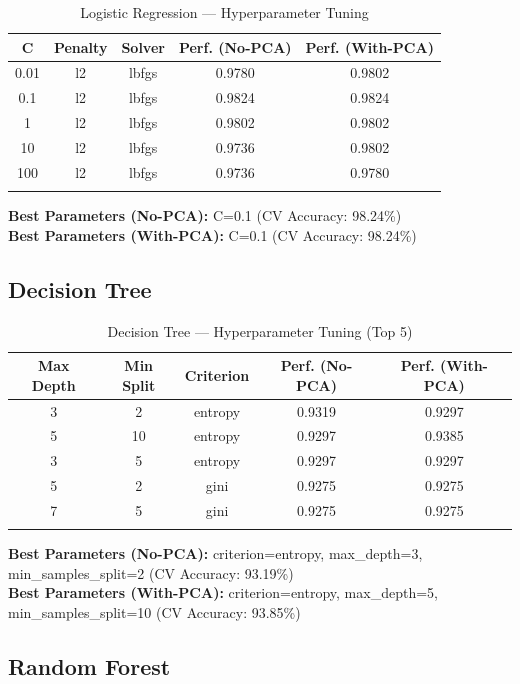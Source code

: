 \documentclass[12pt,a4paper]{article}
\begin{document}
\begin{longtable}{|c|c|c|c|c|}
\hline
\textbf{C} & \textbf{Penalty} & \textbf{Solver} & \textbf{Perf. (No-PCA)} & \textbf{Perf. (With-PCA)} \\ \hline
\endhead
0.01 & l2 & lbfgs & 0.9780 & 0.9802 \\ \hline
0.1 & l2 & lbfgs & 0.9824 & 0.9824 \\ \hline
1 & l2 & lbfgs & 0.9802 & 0.9802 \\ \hline
10 & l2 & lbfgs & 0.9736 & 0.9802 \\ \hline
100 & l2 & lbfgs & 0.9736 & 0.9780 \\ \hline
\caption{Logistic Regression — Hyperparameter Tuning}
\label{tab:lr_tuning}
\end{longtable}

\textbf{Best Parameters (No-PCA):} C=0.1 (CV Accuracy: 98.24\%)\\
\textbf{Best Parameters (With-PCA):} C=0.1 (CV Accuracy: 98.24\%)

\subsection{Decision Tree}

\begin{longtable}{|c|c|c|c|c|}
\hline
\textbf{Max Depth} & \textbf{Min Split} & \textbf{Criterion} & \textbf{Perf. (No-PCA)} & \textbf{Perf. (With-PCA)} \\ \hline
\endhead
3 & 2 & entropy & 0.9319 & 0.9297 \\ \hline
5 & 10 & entropy & 0.9297 & 0.9385 \\ \hline
3 & 5 & entropy & 0.9297 & 0.9297 \\ \hline
5 & 2 & gini & 0.9275 & 0.9275 \\ \hline
7 & 5 & gini & 0.9275 & 0.9275 \\ \hline
\caption{Decision Tree — Hyperparameter Tuning (Top 5)}
\label{tab:dt_tuning}
\end{longtable}

\textbf{Best Parameters (No-PCA):} criterion=entropy, max\_depth=3, min\_samples\_split=2 (CV Accuracy: 93.19\%)\\
\textbf{Best Parameters (With-PCA):} criterion=entropy, max\_depth=5, min\_samples\_split=10 (CV Accuracy: 93.85\%)

\subsection{Random Forest}
\end{document}
